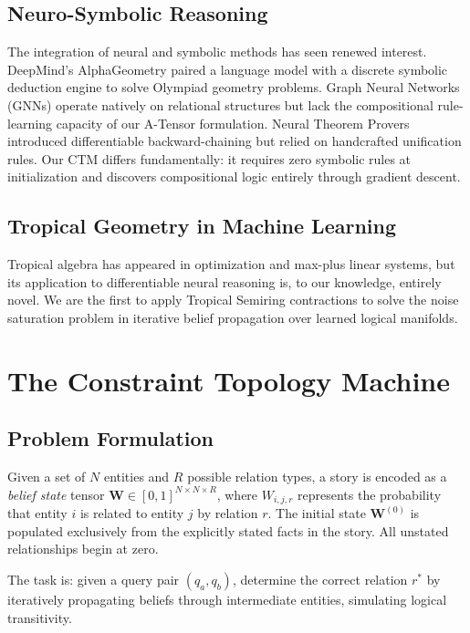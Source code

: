 \documentclass[11pt,a4paper]{article}
\begin{document}
\subsection{Neuro-Symbolic Reasoning}
The integration of neural and symbolic methods has seen renewed interest. DeepMind's AlphaGeometry \cite{trinh2024alphageometry} paired a language model with a discrete symbolic deduction engine to solve Olympiad geometry problems. Graph Neural Networks (GNNs) \cite{kipf2016semi} operate natively on relational structures but lack the compositional rule-learning capacity of our A-Tensor formulation. Neural Theorem Provers \cite{rocktaschel2017end} introduced differentiable backward-chaining but relied on handcrafted unification rules. Our CTM differs fundamentally: it requires zero symbolic rules at initialization and discovers compositional logic entirely through gradient descent.

\subsection{Tropical Geometry in Machine Learning}
Tropical algebra has appeared in optimization \cite{maclagan2015introduction} and max-plus linear systems, but its application to differentiable neural reasoning is, to our knowledge, entirely novel. We are the first to apply Tropical Semiring contractions to solve the noise saturation problem in iterative belief propagation over learned logical manifolds.

\section{The Constraint Topology Machine}

\subsection{Problem Formulation}
Given a set of $N$ entities and $R$ possible relation types, a story is encoded as a \textit{belief state} tensor $\mathbf{W} \in [0, 1]^{N \times N \times R}$, where $W_{i,j,r}$ represents the probability that entity $i$ is related to entity $j$ by relation $r$. The initial state $\mathbf{W}^{(0)}$ is populated exclusively from the explicitly stated facts in the story. All unstated relationships begin at zero.

The task is: given a query pair $(q_a, q_b)$, determine the correct relation $r^*$ by iteratively propagating beliefs through intermediate entities, simulating logical transitivity.
\end{document}
